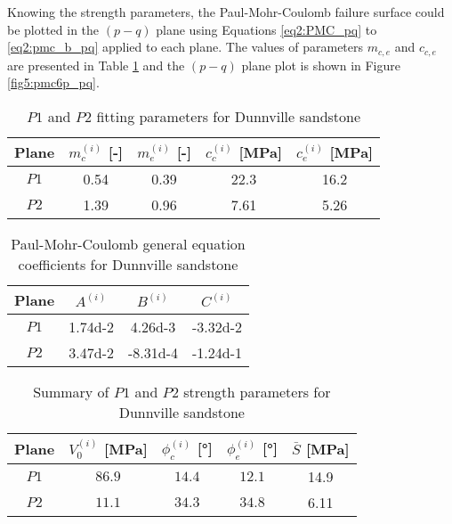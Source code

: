 Knowing the strength parameters, the Paul-Mohr-Coulomb failure surface could be plotted in the $(p-q)$ plane using Equations \ref{eq2:PMC_pq} to \ref{eq2:pmc_b_pq} applied to each plane. The values of parameters $m_{c,e}$ and $c_{c,e}$ are presented in Table \ref{tb5:dunn_pq_para} and the $(p-q)$ plane plot is shown in Figure \ref{fig5:pmc6p_pq}.

\begin{table} [p]
    \centering 
    \captionsetup{justification=centering}
    \caption{$P1$ and $P2$ fitting parameters for Dunnville sandstone}
    \begin{tabular}{ccccc}
        \hline 
        Plane & $m_c^{(i)}$ [-] & $m_e^{(i)}$ [-] & $c_c^{(i)}$ [\si{MPa}] & $c_e^{(i)}$ [\si{MPa}] \\
        \hline
        \hline
        $P1$ & 0.54 & 0.39 & 22.3 & 16.2 \\
        $P2$ & 1.39 & 0.96 & 7.61 & 5.26\\
        \hline
    \end{tabular}
    \label{tb5:dunn_pq_para}
\end{table}

\begin{table} [p]
    \centering 
    \captionsetup{justification=centering}
    \caption{Paul-Mohr-Coulomb general equation coefficients for Dunnville sandstone}
    \begin{tabular}{cccc}
        \hline 
        Plane & $A^{(i)}$ & $B^{(i)}$ & $C^{(i)}$ \\
        \hline
        \hline
        $P1$ & \num{1.74d-2} & \num{4.26d-3} & \num{-3.32d-2} \\
        $P2$ & \num{3.47d-2} & \num{-8.31d-4} & \num{-1.24d-1} \\
        \hline
    \end{tabular}
    \label{tb5:dunn_abc}
\end{table}

\begin{table} [p]
    \centering 
    \captionsetup{justification=centering}
    \caption{Summary of $P1$ and $P2$ strength parameters for Dunnville sandstone}
    \begin{tabular}{ccccc}
        \hline 
        Plane & $V_0^{(i)}$ [\si{MPa}] & $\phi_c^{(i)}$ [\si{\degree}] & $\phi_e^{(i)}$ [\si{\degree}] & $\bar{S}$ [\si{MPa}]\\
        \hline
        \hline
        $P1$ & $86.9$ & $14.4$ & $12.1$ & 14.9\\
        $P2$ & $11.1$ & $34.3$ & $34.8$ & 6.11\\
        \hline
    \end{tabular}
    \label{tb5:dunn_summary}
\end{table}

